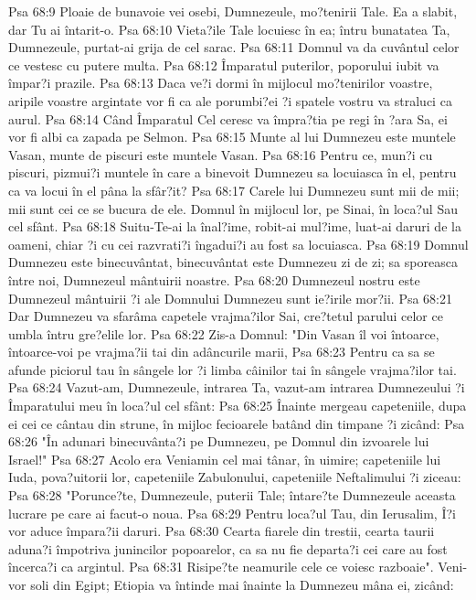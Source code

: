 Psa 68:9  Ploaie de bunavoie vei osebi, Dumnezeule, mo?tenirii Tale. Ea a slabit, dar Tu ai întarit-o.
Psa 68:10  Vieta?ile Tale locuiesc în ea; întru bunatatea Ta, Dumnezeule, purtat-ai grija de cel sarac.
Psa 68:11  Domnul va da cuvântul celor ce vestesc cu putere multa.
Psa 68:12  Împaratul puterilor, poporului iubit va împar?i prazile.
Psa 68:13  Daca ve?i dormi în mijlocul mo?tenirilor voastre, aripile voastre argintate vor fi ca ale porumbi?ei ?i spatele vostru va straluci ca aurul.
Psa 68:14  Când Împaratul Cel ceresc va împra?tia pe regi în ?ara Sa, ei vor fi albi ca zapada pe Selmon.
Psa 68:15  Munte al lui Dumnezeu este muntele Vasan, munte de piscuri este muntele Vasan.
Psa 68:16  Pentru ce, mun?i cu piscuri, pizmui?i muntele în care a binevoit Dumnezeu sa locuiasca în el, pentru ca va locui în el pâna la sfâr?it?
Psa 68:17  Carele lui Dumnezeu sunt mii de mii; mii sunt cei ce se bucura de ele. Domnul în mijlocul lor, pe Sinai, în loca?ul Sau cel sfânt.
Psa 68:18  Suitu-Te-ai la înal?ime, robit-ai mul?ime, luat-ai daruri de la oameni, chiar ?i cu cei razvrati?i îngadui?i au fost sa locuiasca.
Psa 68:19  Domnul Dumnezeu este binecuvântat, binecuvântat este Dumnezeu zi de zi; sa sporeasca între noi, Dumnezeul mântuirii noastre.
Psa 68:20  Dumnezeul nostru este Dumnezeul mântuirii ?i ale Domnului Dumnezeu sunt ie?irile mor?ii.
Psa 68:21  Dar Dumnezeu va sfarâma capetele vrajma?ilor Sai, cre?tetul parului celor ce umbla întru gre?elile lor.
Psa 68:22  Zis-a Domnul: "Din Vasan îl voi întoarce, întoarce-voi pe vrajma?ii tai din adâncurile marii,
Psa 68:23  Pentru ca sa se afunde piciorul tau în sângele lor ?i limba câinilor tai în sângele vrajma?ilor tai.
Psa 68:24  Vazut-am, Dumnezeule, intrarea Ta, vazut-am intrarea Dumnezeului ?i Împaratului meu în loca?ul cel sfânt:
Psa 68:25  Înainte mergeau capeteniile, dupa ei cei ce cântau din strune, în mijloc fecioarele batând din timpane ?i zicând:
Psa 68:26  "În adunari binecuvânta?i pe Dumnezeu, pe Domnul din izvoarele lui Israel!"
Psa 68:27  Acolo era Veniamin cel mai tânar, în uimire; capeteniile lui Iuda, pova?uitorii lor, capeteniile Zabulonului, capeteniile Neftalimului ?i ziceau:
Psa 68:28  "Porunce?te, Dumnezeule, puterii Tale; întare?te Dumnezeule aceasta lucrare pe care ai facut-o noua.
Psa 68:29  Pentru loca?ul Tau, din Ierusalim, Î?i vor aduce împara?ii daruri.
Psa 68:30  Cearta fiarele din trestii, cearta taurii aduna?i împotriva junincilor popoarelor, ca sa nu fie departa?i cei care au fost încerca?i ca argintul.
Psa 68:31  Risipe?te neamurile cele ce voiesc razboaie". Veni-vor soli din Egipt; Etiopia va întinde mai înainte la Dumnezeu mâna ei, zicând:
